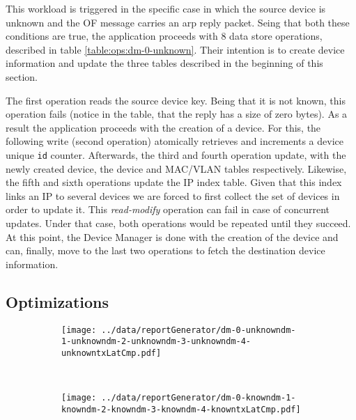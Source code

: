 This workload is triggered in the specific case in which  the source device
is unknown and the \gls{OF} message carries an \gls{arp} reply 
packet. Seing that both these  conditions are true, the application
proceeds  with 8 data store operations, described in table
\ref{table:ops:dm-0-unknown}. Their intention is to create device
information and update the three tables described  in the beginning
of this section.  

The first operation reads the  source device key. Being
that it is not known, this operation fails (notice in the table, that
the reply has a size  of zero bytes). As a result the application
proceeds with the creation of a device. For this, the
following write (second operation) atomically retrieves
and increments a device unique \texttt{id} counter. Afterwards, the third and fourth  operation
update, with the newly created device, the device and MAC/VLAN
tables respectively. Likewise, the fifth and sixth operations update
the \gls{IP} index table. Given that this index links an \gls{IP} to
several devices we are forced to first collect the set of devices in
order to update it. This \emph{read-modify} operation can
fail in case of concurrent updates. Under that case, both operations
would be repeated until they succeed. At this point, the Device Manager
is done with the creation of the device and can, finally, move to the
last two operations to fetch the destination device information. 

\subsection{Optimizations}
\begin{figure}
  \centering
  \begin{subfigure}[b]{0.5\textwidth}
                \centering
                \texttt{[image: ../data/reportGenerator/dm-0-unknowndm-1-unknowndm-2-unknowndm-3-unknowndm-4-unknowntxLatCmp.pdf]}
                \caption{}
                \label{fig:}
        \end{subfigure}%
        ~
        \begin{subfigure}[b]{0.5\textwidth}
                \centering
                \texttt{[image: ../data/reportGenerator/dm-0-knowndm-1-knowndm-2-knowndm-3-knowndm-4-knowntxLatCmp.pdf]}
                \caption{}
                \label{}
        \end{subfigure}
        \caption[Device Manager performance analysis]{}
        \label{fig:dm:performance}
\end{figure}

